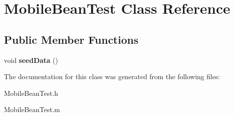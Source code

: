 \hypertarget{interface_mobile_bean_test}{
\section{\-Mobile\-Bean\-Test \-Class \-Reference}
\label{interface_mobile_bean_test}
}
\subsection*{\-Public \-Member \-Functions}
\begin{DoxyCompactItemize}
\item 
\hypertarget{interface_mobile_bean_test_a2fee6b49031a98196efd476784f0322f}{
void {\bfseries seed\-Data} ()}
\label{interface_mobile_bean_test_a2fee6b49031a98196efd476784f0322f}

\end{DoxyCompactItemize}


\-The documentation for this class was generated from the following files\-:\begin{DoxyCompactItemize}
\item 
\-Mobile\-Bean\-Test.\-h\item 
\-Mobile\-Bean\-Test.\-m\end{DoxyCompactItemize}

